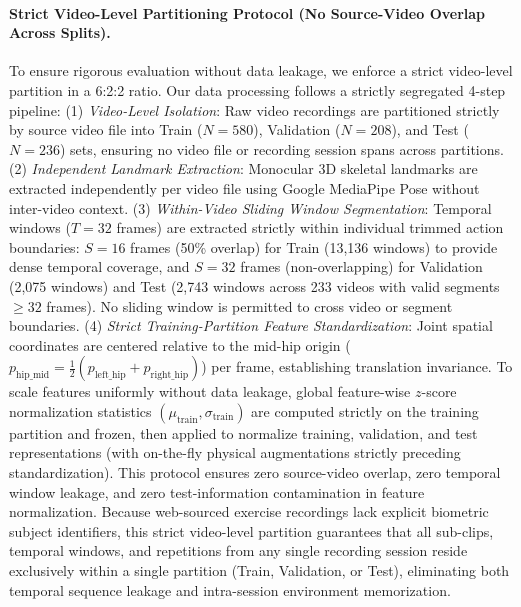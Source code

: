 \documentclass[runningheads]{llncs}
\begin{document}
\paragraph{Strict Video-Level Partitioning Protocol (No Source-Video Overlap Across Splits).} To ensure rigorous evaluation without data leakage, we enforce a strict video-level partition in a 6:2:2 ratio. Our data processing follows a strictly segregated 4-step pipeline: (1) \textit{Video-Level Isolation}: Raw video recordings are partitioned strictly by source video file into Train ($N=580$), Validation ($N=208$), and Test ($N=236$) sets, ensuring no video file or recording session spans across partitions. (2) \textit{Independent Landmark Extraction}: Monocular 3D skeletal landmarks are extracted independently per video file using Google MediaPipe Pose without inter-video context. (3) \textit{Within-Video Sliding Window Segmentation}: Temporal windows ($T = 32$ frames) are extracted strictly within individual trimmed action boundaries: $S = 16$ frames (50\% overlap) for Train (13,136 windows) to provide dense temporal coverage, and $S = 32$ frames (non-overlapping) for Validation (2,075 windows) and Test (2,743 windows across 233 videos with valid segments $\ge 32$ frames). No sliding window is permitted to cross video or segment boundaries. (4) \textit{Strict Training-Partition Feature Standardization}: Joint spatial coordinates are centered relative to the mid-hip origin ($p_{\text{hip\_mid}} = \frac{1}{2}(p_{\text{left\_hip}} + p_{\text{right\_hip}})$) per frame, establishing translation invariance. To scale features uniformly without data leakage, global feature-wise $z$-score normalization statistics $(\mu_{\text{train}}, \sigma_{\text{train}})$ are computed strictly on the training partition and frozen, then applied to normalize training, validation, and test representations (with on-the-fly physical augmentations strictly preceding standardization). This protocol ensures zero source-video overlap, zero temporal window leakage, and zero test-information contamination in feature normalization. Because web-sourced exercise recordings lack explicit biometric subject identifiers, this strict video-level partition guarantees that all sub-clips, temporal windows, and repetitions from any single recording session reside exclusively within a single partition (Train, Validation, or Test), eliminating both temporal sequence leakage and intra-session environment memorization.
\end{document}

